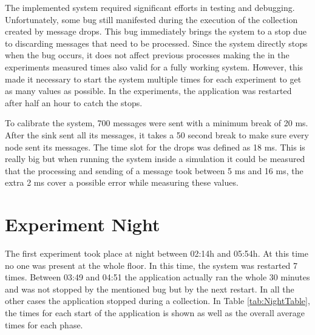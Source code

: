 The implemented system required significant efforts in testing and debugging. Unfortunately, some bug still manifested during the execution of the collection created by message drops. This bug immediately brings the system to a stop due to discarding messages that need to be processed. Since the system directly stops when the bug occurs, it does not affect previous processes making the in the experiments measured times also valid for a fully working system. However, this made it necessary to start the system multiple times for each experiment to get as many values as possible. In the experiments, the application was restarted after half an hour to catch the stops.

To calibrate the system, 700 messages were sent with a minimum break of 20 ms. After the sink sent all its messages, it takes a 50 second break to make sure every node sent its messages. The time slot for the drops was defined as 18 ms. This is really big but when running the system inside a simulation it could be measured that the processing and sending of a message took between 5 ms and 16 ms, the extra 2 ms cover a possible error while measuring these values.  
\section{Experiment Night}
The first experiment took place at night between 02:14h and 05:54h. At this time no one was present at the whole floor. In this time, the system was restarted 7 times. Between 03:49 and 04:51 the application actually ran the whole 30 minutes and was not stopped by the mentioned bug but by the next restart. In all the other cases the application stopped during a collection. In Table \ref{tab:NightTable}, the times for each start of the application is shown as well as the overall average times for each phase. 

